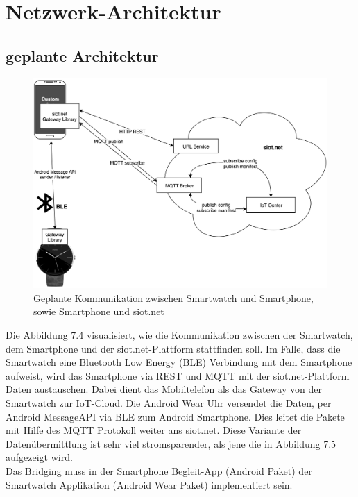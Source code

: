 \section{Netzwerk-Architektur}
\subsection{geplante Architektur}
\begin{figure}[h]
  \centering
  \includegraphics[scale=0.15]{98_Bilder/07_Architektur/01_Architektur}
  \caption[Geplante Netzwerk-Architektur mit \gls{URL}/ohne WLAN]{Geplante Kommunikation zwischen Smartwatch und Smartphone, sowie Smartphone und siot.net}
\end{figure}
Die Abbildung 7.4 visualisiert, wie die Kommunikation zwischen der Smartwatch, dem Smartphone und der siot.net-Plattform stattfinden soll. Im Falle, dass die Smartwatch eine Bluetooth Low Energy (\gls{BLE}) Verbindung mit dem Smartphone aufweist, wird das Smartphone via \gls{REST} und \gls{MQTT} mit der siot.net-Plattform Daten austauschen. Dabei dient das Mobiltelefon als das Gateway von der Smartwatch zur \gls{IoT}-Cloud. Die Android Wear Uhr versendet die Daten, per Android Message\gls{API} via \gls{BLE} zum Android Smartphone. Dies leitet die Pakete mit Hilfe des \gls{MQTT} Protokoll weiter ans siot.net. Diese Variante der Datenübermittlung ist sehr viel stromsparender, als jene die in Abbildung 7.5 aufgezeigt wird.\\
Das Bridging muss in der Smartphone Begleit-App (Android Paket) der Smartwatch Applikation (Android Wear Paket) implementiert sein.
\newpage
